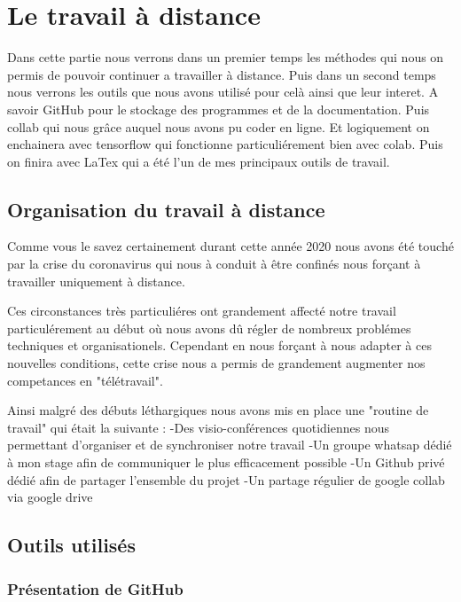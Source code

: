
\hypertarget{Le-travail-a-distance}{%
\chapter{Le travail à distance}\label{Le-travail-a-distance}}

Dans cette partie nous verrons dans un premier temps les méthodes qui nous on permis de pouvoir continuer a travailler à distance. Puis dans un second temps nous verrons les outils que nous avons utilisé pour celà ainsi que leur interet. A savoir GitHub pour le stockage des programmes et de la documentation. Puis collab qui nous grâce auquel nous avons pu coder en ligne. Et logiquement on enchainera avec tensorflow qui fonctionne particuliérement bien avec colab. Puis on finira avec LaTex qui a été l'un de mes principaux outils de travail.

\hypertarget{Organisation-du-travail-a-distance}{%
\section{Organisation du travail à distance}\label{Organisation-du-travail-a-distance}}


Comme vous le savez certainement durant cette année 2020 nous avons été touché par la crise du coronavirus qui nous à conduit à être confinés nous forçant à travailler uniquement à distance.

Ces circonstances très particuliéres ont grandement affecté notre travail particulérement au début où nous avons dû régler de nombreux problémes techniques et organisationels. Cependant en nous forçant à nous adapter à ces nouvelles conditions, cette crise nous a permis de grandement augmenter nos competances en "télétravail".

Ainsi malgré des débuts léthargiques nous avons mis en place une "routine de travail" qui était la suivante :
-Des visio-conférences quotidiennes nous permettant d'organiser et de synchroniser notre travail
-Un groupe whatsap dédié à mon stage afin de communiquer le plus efficacement possible
-Un Github privé dédié afin de partager l'ensemble du projet
-Un partage régulier de google collab via google drive


\hypertarget{Outils-utilisuxe9s}{%
\section{Outils utilisés}
\label{Outils-utilisuxe9s}}

\hypertarget{Pruxe9sentation-de-GitHub}{%
\subsection{Présentation de GitHub}
\label{Pruxe9sentation-de-GitHub}}

